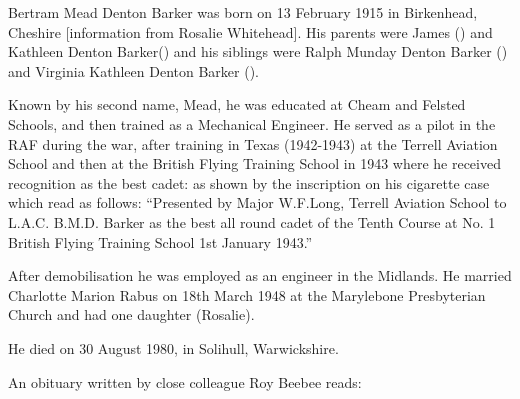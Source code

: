 
Bertram Mead Denton Barker was born on 13 February 1915 in Birkenhead, Cheshire [information from Rosalie Whitehead].  His parents were James () and Kathleen Denton Barker() and his siblings were Ralph Munday Denton Barker () and Virginia Kathleen Denton Barker ().

Known by his second name, Mead, he was educated at Cheam and Felsted Schools, and then trained as a Mechanical Engineer. He served as a pilot in the RAF during the war,  after training in Texas (1942-1943) at the Terrell Aviation School and then at the British Flying Training School in 1943 where he  received recognition as the best cadet:  as shown by the inscription on his cigarette case which read as follows: ``Presented by Major W.F.Long, Terrell Aviation School to L.A.C. B.M.D. Barker as the best all round cadet of the Tenth Course at No. 1 British Flying Training School 1st January 1943.''

After demobilisation he was employed as an engineer in the Midlands. He married Charlotte Marion Rabus on 18th March 1948 at the Marylebone Presbyterian Church \cite{TheTimes1948-03-22} and had one daughter (Rosalie).

He died on 30 August 1980, in Solihull, Warwickshire. 

An obituary written by close colleague Roy Beebee reads:

